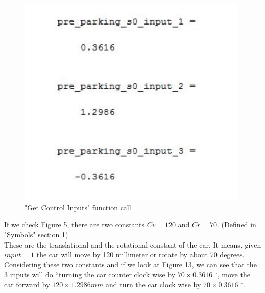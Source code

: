 \documentclass[12pt, letterpaper]{amsart} %
\numberwithin{equation}{section}
\begin{document}
\begin{figure}[h!]
\includegraphics[width=110mm]{./img/fig_13.png}
\caption{"Get Control Inputs" function call}
\label{fig:figure13}	
\end{figure}

If we check Figure 5, there are two constants $Cv=120$ 
and $Cr=70$. (Defined in "Symbols" section 1)
\\These are the translational and the rotational constant of the car. It means, given  
$input=1$ the car will move by 120 millimeter or rotate by about 70 degrees. 
Considering these two constants and if we look at Figure 13, we can see that 
the 3 inputs will do “turning the car counter clock 
wise by $70 \times 0.3616$ $^{\circ}$, move the car forward by 
$120 \times 1.2986 mm$ and turn the car clock wise by $70 \times 0.3616$ $^{\circ}$. 
\newpage
\end{document}
